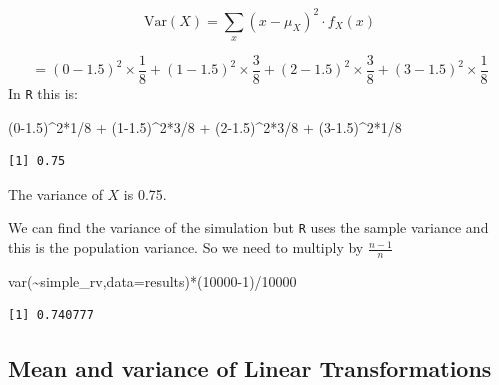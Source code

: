 \documentclass[
  letterpaper,
  DIV=11,
  numbers=noendperiod]{scrreprt}
\newenvironment{Shaded}{\begin{snugshade}}{\end{snugshade}}
\newcommand{\AttributeTok}[1]{\textcolor[rgb]{0.40,0.45,0.13}{#1}}
\newcommand{\DecValTok}[1]{\textcolor[rgb]{0.68,0.00,0.00}{#1}}
\newcommand{\FloatTok}[1]{\textcolor[rgb]{0.68,0.00,0.00}{#1}}
\newcommand{\FunctionTok}[1]{\textcolor[rgb]{0.28,0.35,0.67}{#1}}
\newcommand{\NormalTok}[1]{\textcolor[rgb]{0.00,0.23,0.31}{#1}}
\newcommand{\SpecialCharTok}[1]{\textcolor[rgb]{0.37,0.37,0.37}{#1}}
\begin{document}
\[
\mbox{Var}(X)=\sum_x (x-\mu_X)^2 \cdot f_X(x) 
\]

\[
= (0-1.5)^2 \times \frac{1}{8} + (1-1.5)^2 \times \frac{3}{8}+(2-1.5)^2 \times \frac{3}{8} + (3-1.5)^2\times \frac{1}{8}
\] In \texttt{R} this is:

\begin{Shaded}
\begin{Highlighting}[]
\NormalTok{(}\DecValTok{0}\FloatTok{{-}1.5}\NormalTok{)}\SpecialCharTok{\^{}}\DecValTok{2}\SpecialCharTok{*}\DecValTok{1}\SpecialCharTok{/}\DecValTok{8} \SpecialCharTok{+}\NormalTok{ (}\DecValTok{1}\FloatTok{{-}1.5}\NormalTok{)}\SpecialCharTok{\^{}}\DecValTok{2}\SpecialCharTok{*}\DecValTok{3}\SpecialCharTok{/}\DecValTok{8} \SpecialCharTok{+}\NormalTok{ (}\DecValTok{2}\FloatTok{{-}1.5}\NormalTok{)}\SpecialCharTok{\^{}}\DecValTok{2}\SpecialCharTok{*}\DecValTok{3}\SpecialCharTok{/}\DecValTok{8} \SpecialCharTok{+}\NormalTok{ (}\DecValTok{3}\FloatTok{{-}1.5}\NormalTok{)}\SpecialCharTok{\^{}}\DecValTok{2}\SpecialCharTok{*}\DecValTok{1}\SpecialCharTok{/}\DecValTok{8}
\end{Highlighting}
\end{Shaded}

\begin{verbatim}
[1] 0.75
\end{verbatim}

The variance of \(X\) is 0.75.

We can find the variance of the simulation but \texttt{R} uses the
sample variance and this is the population variance. So we need to
multiply by \(\frac{n-1}{n}\)

\begin{Shaded}
\begin{Highlighting}[]
\FunctionTok{var}\NormalTok{(}\SpecialCharTok{\textasciitilde{}}\NormalTok{simple\_rv,}\AttributeTok{data=}\NormalTok{results)}\SpecialCharTok{*}\NormalTok{(}\DecValTok{10000{-}1}\NormalTok{)}\SpecialCharTok{/}\DecValTok{10000}
\end{Highlighting}
\end{Shaded}

\begin{verbatim}
[1] 0.740777
\end{verbatim}

\subsection{Mean and variance of Linear
Transformations}\label{mean-and-variance-of-linear-transformations}
\end{document}

